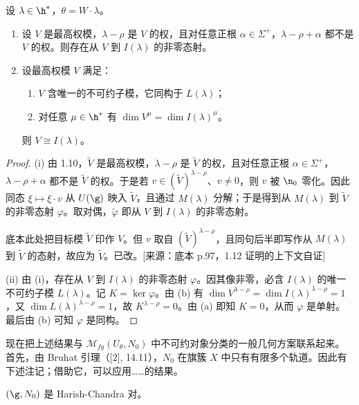 \begin{lemma}\label{lem:05.1.12}
设 $\lambda\in\h^*$，$\theta=W\cdot\lambda$。
\begin{enumerate}[label=(\roman*)]
\item 设 $V$ 是最高权模，$\lambda-\rho$ 是 $V$ 的权，且对任意正根 $\alpha\in\Sigma^+$，$\lambda-\rho+\alpha$ 都不是 $V$ 的权。则存在从 $V$ 到 $I(\lambda)$ 的非零态射。
\item 设最高权模 $V$ 满足：
\begin{enumerate}[label=(\alph*)]
\item $V$ 含唯一的不可约子模，它同构于 $L(\lambda)$；
\item 对任意 $\mu\in\h^*$ 有 $\dim V^\mu=\dim I(\lambda)^\mu$。
\end{enumerate}
则 $V\cong I(\lambda)$。
\end{enumerate}
\end{lemma}

\begin{proof}
(i) 由 1.10，$\tilde V$ 是最高权模，$\lambda-\rho$ 是 $\tilde V$ 的权，且对任意正根 $\alpha\in\Sigma^+$，$\lambda-\rho+\alpha$ 都不是 $\tilde V$ 的权。于是若 $v\in(\tilde V)^{\lambda-\rho}$、$v\neq 0$，则 $v$ 被 $\n_0$ 零化。因此同态 $\xi\mapsto\xi\cdot v$ 从 $U(\g)$ 映入 $\tilde V$，且通过 $M(\lambda)$ 分解；于是得到从 $M(\lambda)$ 到 $\tilde V$ 的非零态射 $\varphi$。取对偶，$\tilde\varphi$ 即从 $V$ 到 $I(\lambda)$ 的非零态射。
\begin{annote}
底本此处把目标模 $\tilde V$ 印作 $V$。但 $v$ 取自 $(\tilde V)^{\lambda-\rho}$，且同句后半即写作从 $M(\lambda)$ 到 $\tilde V$ 的态射，故应为 $\tilde V$。已改。[来源：底本 p.97，1.12 证明的上下文自证]
\end{annote}

(ii) 由 (i)，存在从 $V$ 到 $I(\lambda)$ 的非零态射 $\varphi$。因其像非零，必含 $I(\lambda)$ 的唯一不可约子模 $L(\lambda)$。记 $K=\ker\varphi$。由 (b) 有 $\dim V^{\lambda-\rho}=\dim I(\lambda)^{\lambda-\rho}=1$，又 $\dim L(\lambda)^{\lambda-\rho}=1$，故 $K^{\lambda-\rho}=0$。由 (a) 即知 $K=0$，从而 $\varphi$ 是单射。最后由 (b) 可知 $\varphi$ 是同构。
\end{proof}

现在把上述结果与 $\mathcal{M}_{fg}(U_\theta,N_0)$ 中不可约对象分类的一般几何方案联系起来。首先，由 Bruhat 引理（[2], 14.11），$N_0$ 在旗簇 $X$ 中只有有限多个轨道。因此有下述注记；借助它，可以应用……的结果。

\begin{proposition}\label{prop:05.1.13}
$(\g,N_0)$ 是 Harish-Chandra 对。
\end{proposition}


